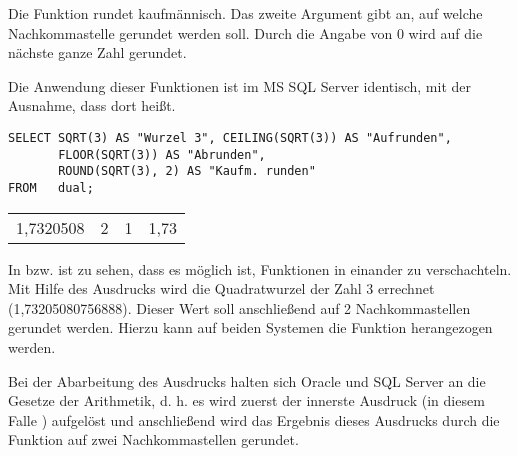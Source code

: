 \begin{merke}
    Die Funktion  rundet kaufmännisch. Das zweite
    Argument gibt an, auf welche Nachkommastelle gerundet werden soll.
    Durch die Angabe von 0 wird auf die nächste ganze Zahl gerundet.
\end{merke}
Die Anwendung dieser Funktionen ist im MS SQL Server identisch, mit der
Ausnahme, dass  dort 
heißt.
\begin{lstlisting}[language=ms_sql,caption={Rundungsfunktionen in MS SQL},label=sql03_16]
SELECT SQRT(3) AS "Wurzel 3", CEILING(SQRT(3)) AS "Aufrunden",
       FLOOR(SQRT(3)) AS "Abrunden",
       ROUND(SQRT(3), 2) AS "Kaufm. runden"
FROM   dual;
        \end{lstlisting}
\begin{center}
    \begin{small}
        \tablehead{}

        \begin{mssql}
            \begin{supertabular}{llll}
                1,7320508 & 2 & 1 & 1,73 \\
            \end{supertabular}
        \end{mssql}
    \end{small}
\end{center}
In  bzw.  ist zu sehen, dass es
möglich ist, Funktionen in einander zu verschachteln. Mit Hilfe des
Ausdrucks  wird die Quadratwurzel der Zahl 3
errechnet (1,73205080756888). Dieser Wert soll anschließend auf 2
Nachkommastellen gerundet werden. Hierzu kann auf beiden Systemen die
Funktion  herangezogen werden.

Bei der Abarbeitung des Ausdrucks 
halten sich Oracle und SQL Server an die Gesetze der Arithmetik, d. h.
es wird zuerst der innerste Ausdruck (in diesem Falle
) aufgelöst und anschließend wird das
Ergebnis dieses Ausdrucks durch die Funktion  auf
zwei Nachkommastellen gerundet.

